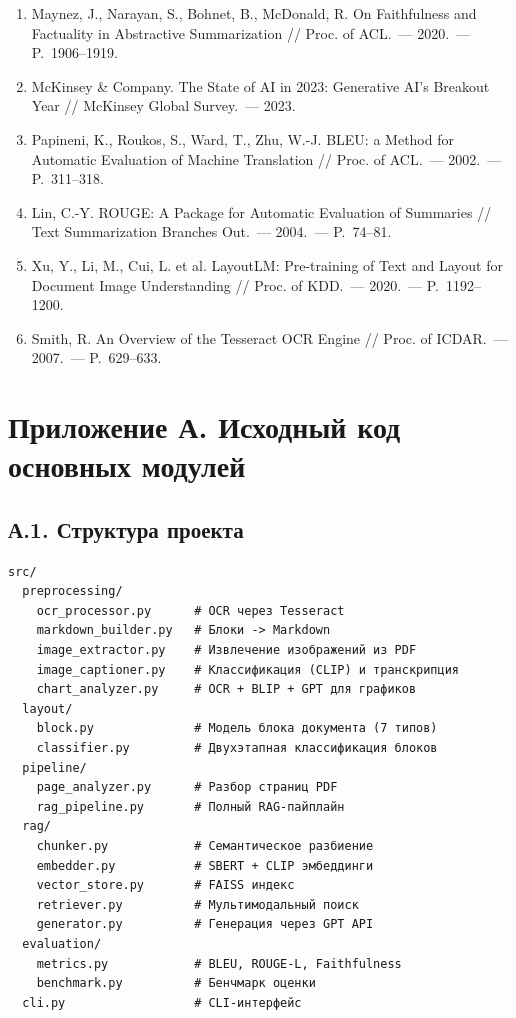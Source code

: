 \documentclass[a4paper,12pt]{article}
\begin{document}
\begin{enumerate}
    \item Maynez, J., Narayan, S., Bohnet, B., McDonald, R. On Faithfulness and Factuality in Abstractive Summarization // Proc. of ACL.~--- 2020.~--- P.~1906--1919. \label{ref:maynez2020hallucinations}

    \item McKinsey \& Company. The State of AI in 2023: Generative AI's Breakout Year // McKinsey Global Survey.~--- 2023. \label{ref:mckinsey2023}

    \item Papineni, K., Roukos, S., Ward, T., Zhu, W.-J. BLEU: a Method for Automatic Evaluation of Machine Translation // Proc. of ACL.~--- 2002.~--- P.~311--318. \label{ref:papineni2002bleu}

    \item Lin, C.-Y. ROUGE: A Package for Automatic Evaluation of Summaries // Text Summarization Branches Out.~--- 2004.~--- P.~74--81. \label{ref:lin2004rouge}

    \item Xu, Y., Li, M., Cui, L. et al. LayoutLM: Pre-training of Text and Layout for Document Image Understanding // Proc. of KDD.~--- 2020.~--- P.~1192--1200. \label{ref:xu2020layoutlm}

    \item Smith, R. An Overview of the Tesseract OCR Engine // Proc. of ICDAR.~--- 2007.~--- P.~629--633. \label{ref:smith2007tesseract}
\end{enumerate}

\newpage

\section*{Приложение А. Исходный код основных модулей}

\subsection*{А.1. Структура проекта}

\begin{lstlisting}[caption={Структура проекта}]
src/
  preprocessing/
    ocr_processor.py      # OCR через Tesseract
    markdown_builder.py   # Блоки -> Markdown
    image_extractor.py    # Извлечение изображений из PDF
    image_captioner.py    # Классификация (CLIP) и транскрипция
    chart_analyzer.py     # OCR + BLIP + GPT для графиков
  layout/
    block.py              # Модель блока документа (7 типов)
    classifier.py         # Двухэтапная классификация блоков
  pipeline/
    page_analyzer.py      # Разбор страниц PDF
    rag_pipeline.py       # Полный RAG-пайплайн
  rag/
    chunker.py            # Семантическое разбиение
    embedder.py           # SBERT + CLIP эмбеддинги
    vector_store.py       # FAISS индекс
    retriever.py          # Мультимодальный поиск
    generator.py          # Генерация через GPT API
  evaluation/
    metrics.py            # BLEU, ROUGE-L, Faithfulness
    benchmark.py          # Бенчмарк оценки
  cli.py                  # CLI-интерфейс
\end{lstlisting}
\end{document}
